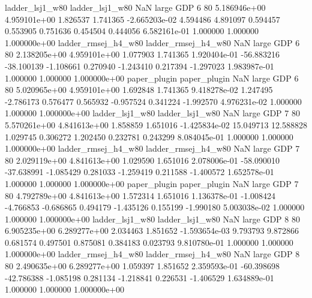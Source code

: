     ladder_lsj1_w80     ladder_lsj1_w80                   NaN      large      GDP                 6 80 5.186946e+00   4.959101e+00      1.826537       1.741365 -2.665203e-02      4.594486      4.891097     0.594457       0.553905  0.751636   0.454504     0.444056   6.582161e-01            1.000000        1.000000        1.000000e+00
ladder_rmsej_h4_w80 ladder_rmsej_h4_w80                   NaN      large      GDP                 6 80 2.138205e+00   4.959101e+00      1.077903       1.741365  1.920404e-01    -56.883216    -38.100139    -1.108661       0.270940 -1.243410   0.217394    -1.297023   1.983987e-01            1.000000        1.000000        1.000000e+00
       paper_plugin        paper_plugin                   NaN      large      GDP                 6 80 5.020965e+00   4.959101e+00      1.692848       1.741365  9.418278e-02      1.247495     -2.786173     0.576477       0.565932 -0.957524   0.341224    -1.992570   4.976231e-02            1.000000        1.000000        1.000000e+00
    ladder_lsj1_w80     ladder_lsj1_w80                   NaN      large      GDP                 7 80 5.570261e+00   4.841613e+00      1.858859       1.651016 -1.425834e-02     15.049713     12.588828     1.029745       0.306272  1.202450   0.232781     0.243299   8.084045e-01            1.000000        1.000000        1.000000e+00
ladder_rmsej_h4_w80 ladder_rmsej_h4_w80                   NaN      large      GDP                 7 80 2.029119e+00   4.841613e+00      1.029590       1.651016  2.078006e-01    -58.090010    -37.638991    -1.085429       0.281033 -1.259419   0.211588    -1.400572   1.652578e-01            1.000000        1.000000        1.000000e+00
       paper_plugin        paper_plugin                   NaN      large      GDP                 7 80 4.792789e+00   4.841613e+00      1.572314       1.651016  1.136378e-01     -1.008424     -4.766853    -0.686865       0.494179 -1.435126   0.155199    -1.990180   5.003038e-02            1.000000        1.000000        1.000000e+00
    ladder_lsj1_w80     ladder_lsj1_w80                   NaN      large      GDP                 8 80 6.905235e+00   6.289277e+00      2.034463       1.851652 -1.593654e-03      9.793793      9.872866     0.681574       0.497501  0.875081   0.384183     0.023793   9.810780e-01            1.000000        1.000000        1.000000e+00
ladder_rmsej_h4_w80 ladder_rmsej_h4_w80                   NaN      large      GDP                 8 80 2.490635e+00   6.289277e+00      1.059397       1.851652  2.359593e-01    -60.398698    -42.786388    -1.085198       0.281134 -1.218841   0.226531    -1.406529   1.634889e-01            1.000000        1.000000        1.000000e+00
